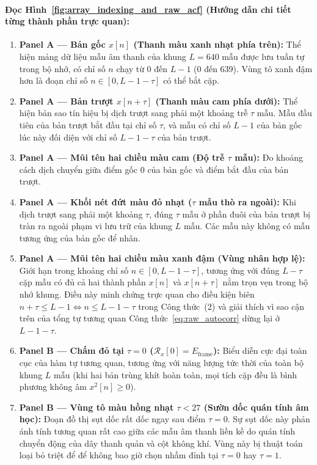 \documentclass[11pt,a4paper]{article}
\begin{document}
\paragraph{Đọc Hình~\ref{fig:array_indexing_and_raw_acf} (Hướng dẫn chi tiết từng thành phần trực quan):}
\begin{enumerate}
    \setlength{\itemsep}{1.5pt}
    \item \textbf{Panel A --- Bản gốc $x[n]$ (Thanh màu xanh nhạt phía trên):} Thể hiện mảng dữ liệu mẫu âm thanh của khung $L = 640$ mẫu được lưu tuần tự trong bộ nhớ, có chỉ số $n$ chạy từ $0$ đến $L - 1$ ($0$ đến $639$). Vùng tô xanh đậm hơn là đoạn chỉ số $n \in [0, L - 1 - \tau]$ có thể bắt cặp.
    \item \textbf{Panel A --- Bản trượt $x[n+\tau]$ (Thanh màu cam phía dưới):} Thể hiện bản sao tín hiệu bị dịch trượt sang phải một khoảng trễ $\tau$ mẫu. Mẫu đầu tiên của bản trượt bắt đầu tại chỉ số $\tau$, và mẫu có chỉ số $L - 1$ của bản gốc lúc này đối diện với chỉ số $L - 1 - \tau$ của bản trượt.
    \item \textbf{Panel A --- Mũi tên hai chiều màu cam (Độ trễ $\tau$ mẫu):} Đo khoảng cách dịch chuyển giữa điểm gốc $0$ của bản gốc và điểm bắt đầu của bản trượt.
    \item \textbf{Panel A --- Khối nét đứt màu đỏ nhạt ($\tau$ mẫu thò ra ngoài):} Khi dịch trượt sang phải một khoảng $\tau$, đúng $\tau$ mẫu ở phần đuôi của bản trượt bị tràn ra ngoài phạm vi lưu trữ của khung $L$ mẫu. Các mẫu này không có mẫu tương ứng của bản gốc để nhân.
    \item \textbf{Panel A --- Mũi tên hai chiều màu xanh đậm (Vùng nhân hợp lệ):} Giới hạn trong khoảng chỉ số $n \in [0, L - 1 - \tau]$, tương ứng với đúng $L - \tau$ cặp mẫu có đủ cả hai thành phần $x[n]$ và $x[n+\tau]$ nằm trọn vẹn trong bộ nhớ khung. Điều này minh chứng trực quan cho điều kiện biên $n + \tau \le L - 1 \iff n \le L - 1 - \tau$ trong Công thức~(2) và giải thích vì sao cận trên của tổng tự tương quan Công thức~\eqref{eq:raw_autocorr} dừng lại ở $L - 1 - \tau$.
    \item \textbf{Panel B --- Chấm đỏ tại $\tau = 0$ ($\mathcal{R}_x[0] = E_{\text{frame}}$):} Biểu diễn cực đại toàn cục của hàm tự tương quan, tương ứng với năng lượng tức thời của toàn bộ khung $L$ mẫu (khi hai bản trùng khít hoàn toàn, mọi tích cặp đều là bình phương không âm $x^2[n] \ge 0$).
    \item \textbf{Panel B --- Vùng tô màu hồng nhạt $\tau < 27$ (Sườn dốc quán tính âm học):} Đoạn đồ thị sụt dốc rất dốc ngay sau điểm $\tau = 0$. Sự sụt dốc này phản ánh tính tương quan rất cao giữa các mẫu âm thanh liền kề do quán tính chuyển động của dây thanh quản và cột không khí. Vùng này bị thuật toán loại bỏ triệt để để không bao giờ chọn nhầm đỉnh tại $\tau = 0$ hay $\tau = 1$.

\end{enumerate}
\end{document}
